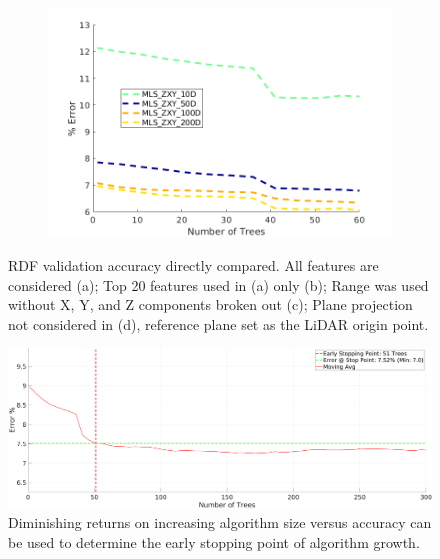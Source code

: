 \documentclass[journal,onecolumn]{IEEEtran}
\begin{document}
\begin{figure}[H]
\begin{subfigure}{0.45\textwidth}
			\caption[]{}
			\label{fig:range_mls_ransac_comp}
		\end{subfigure}
		\begin{subfigure}{0.45\textwidth}
			\centering
			\includegraphics[width=1\linewidth]{figures/zxy}
			\caption[]{}
			\label{fig:t20_mls_ransac_comp}
		\end{subfigure}
		\caption[RDF Validation Accuracy]{RDF validation accuracy directly compared. All features are considered (a); Top 20 features used in (a) only (b); Range was used without X, Y, and Z components broken out (c); Plane projection not considered in (d), reference plane set as the LiDAR origin point.}
		\label{fig:all_tree_comp}
	\end{figure}

	\begin{figure}[H]
			\centering
			\includegraphics[width=0.75\linewidth]{figures/early_stopping_example}
			\caption[Early Stopping]{Diminishing returns on increasing algorithm size versus accuracy can be used to determine the early stopping point of algorithm growth.}
			\label{fig:mls_zxy_early_stopping}
	\end{figure}
	
	
\end{document}
